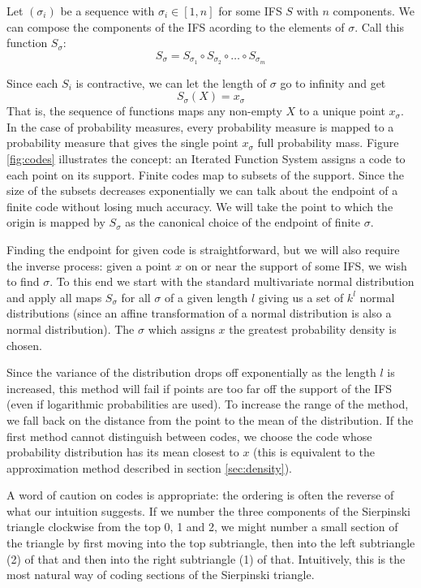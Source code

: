 \documentclass[10pt,a4paper,oneside]{article}
\theoremstyle{definition}
\begin{document}
Let $(\sigma_i)$ be a sequence with $\sigma_i \in [1, n]$ for some IFS $S$ with $n$ components. We can compose the components of the IFS acording to the elements of $\sigma$. Call this function $S_\sigma$:
\[
S_\sigma = S_{\sigma_1} \circ S_{\sigma_2} \circ \ldots \circ S_{\sigma_m}
\]

Since each $S_i$ is contractive, we can let the length of $\sigma$ go to infinity and get 
\[
S_\sigma(X) = x_\sigma  
\] 
That is, the sequence of functions maps any non-empty $X$ to a unique point $x_\sigma$. In the case of probability measures, every probability measure is mapped to a probability measure that gives the single point $x_\sigma$ full probability mass. Figure \ref{fig:codes} illustrates the concept: an Iterated Function System assigns a code to each point on its support. Finite codes map to subsets of the support. Since the size of the subsets decreases exponentially we can talk about the endpoint of a finite code without losing much accuracy. We will take the point to which the origin is mapped by $S_\sigma$ as the canonical choice of the endpoint of finite $\sigma$.

Finding the endpoint for given code is straightforward, but we will also require the inverse process: given a point $x$ on or near the support of some IFS, we wish to find $\sigma$. To this end we start with the standard  multivariate normal distribution and apply all maps $S_\sigma$ for all $\sigma$ of a given length $l$ giving us a set of $k^l$ normal distributions (since an affine transformation of a normal distribution is also a normal distribution). The $\sigma$ which assigns $x$ the greatest probability density is chosen.

Since the variance of the distribution drops off exponentially as the length $l$ is increased, this method will fail if points are too far off the support of the IFS (even if logarithmic probabilities are used). To increase the range of the method, we fall back on the distance from the point to the mean of the distribution. If the first method cannot distinguish between codes, we choose the code whose probability distribution has its mean closest to $x$ (this is equivalent to the approximation method described in section \ref{sec:density}).

A word of caution on codes is appropriate: the ordering is often the reverse of what our intuition suggests. If we number the three components of the Sierpinski triangle clockwise from the top 0, 1 and 2, we might number a small section of the triangle by first moving into the top subtriangle, then into the left subtriangle (2) of that and then into the right subtriangle (1) of that. Intuitively, this is the most natural way of coding sections of the Sierpinski triangle.
\end{document}
